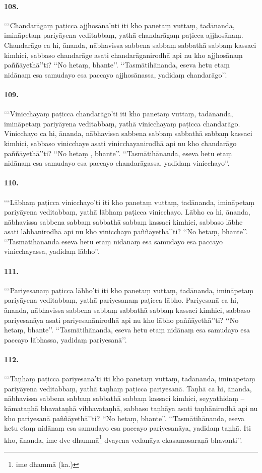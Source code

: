 \paragraph{108.} ‘‘‘Chandarāgaṃ paṭicca ajjhosāna’nti iti kho panetaṃ vuttaṃ, tadānanda, imināpetaṃ pariyāyena veditabbaṃ, yathā chandarāgaṃ paṭicca ajjhosānaṃ. Chandarāgo ca hi, ānanda, nābhavissa sabbena sabbaṃ sabbathā sabbaṃ kassaci kimhici, sabbaso chandarāge asati chandarāganirodhā api nu kho ajjhosānaṃ paññāyethā’’ti? ‘‘No hetaṃ, bhante’’. ‘‘Tasmātihānanda, eseva hetu etaṃ nidānaṃ esa samudayo esa paccayo ajjhosānassa, yadidaṃ chandarāgo’’.

\paragraph{109.} ‘‘‘Vinicchayaṃ paṭicca chandarāgo’ti iti kho panetaṃ vuttaṃ, tadānanda, imināpetaṃ pariyāyena veditabbaṃ, yathā vinicchayaṃ paṭicca chandarāgo. Vinicchayo ca hi, ānanda, nābhavissa sabbena sabbaṃ sabbathā sabbaṃ kassaci kimhici, sabbaso vinicchaye asati vinicchayanirodhā api nu kho chandarāgo paññāyethā’’ti? ‘‘No hetaṃ , bhante’’. ‘‘Tasmātihānanda, eseva hetu etaṃ nidānaṃ esa samudayo esa paccayo chandarāgassa, yadidaṃ vinicchayo’’.

\paragraph{110.} ‘‘‘Lābhaṃ paṭicca vinicchayo’ti iti kho panetaṃ vuttaṃ, tadānanda, imināpetaṃ pariyāyena veditabbaṃ, yathā lābhaṃ paṭicca vinicchayo. Lābho ca hi, ānanda, nābhavissa sabbena sabbaṃ sabbathā sabbaṃ kassaci kimhici, sabbaso lābhe asati lābhanirodhā api nu kho vinicchayo paññāyethā’’ti? ‘‘No hetaṃ, bhante’’. ‘‘Tasmātihānanda eseva hetu etaṃ nidānaṃ esa samudayo esa paccayo vinicchayassa, yadidaṃ lābho’’.

\paragraph{111.} ‘‘‘Pariyesanaṃ paṭicca lābho’ti iti kho panetaṃ vuttaṃ, tadānanda, imināpetaṃ pariyāyena veditabbaṃ, yathā pariyesanaṃ paṭicca lābho. Pariyesanā ca hi, ānanda, nābhavissa sabbena sabbaṃ sabbathā sabbaṃ kassaci kimhici, sabbaso pariyesanāya asati pariyesanānirodhā api nu kho lābho paññāyethā’’ti? ‘‘No hetaṃ, bhante’’. ‘‘Tasmātihānanda, eseva hetu etaṃ nidānaṃ esa samudayo esa paccayo lābhassa, yadidaṃ pariyesanā’’.

\paragraph{112.} ‘‘‘Taṇhaṃ paṭicca pariyesanā’ti iti kho panetaṃ vuttaṃ, tadānanda, imināpetaṃ pariyāyena veditabbaṃ, yathā taṇhaṃ paṭicca pariyesanā. Taṇhā ca hi, ānanda, nābhavissa sabbena sabbaṃ sabbathā sabbaṃ kassaci kimhici, seyyathidaṃ – kāmataṇhā bhavataṇhā vibhavataṇhā, sabbaso taṇhāya asati taṇhānirodhā api nu kho pariyesanā paññāyethā’’ti? ‘‘No hetaṃ, bhante’’. ‘‘Tasmātihānanda, eseva hetu etaṃ nidānaṃ esa samudayo esa paccayo pariyesanāya, yadidaṃ taṇhā. Iti kho, ānanda, ime dve dhammā\footnote{ime dhammā (ka.)} dvayena vedanāya ekasamosaraṇā bhavanti’’.

